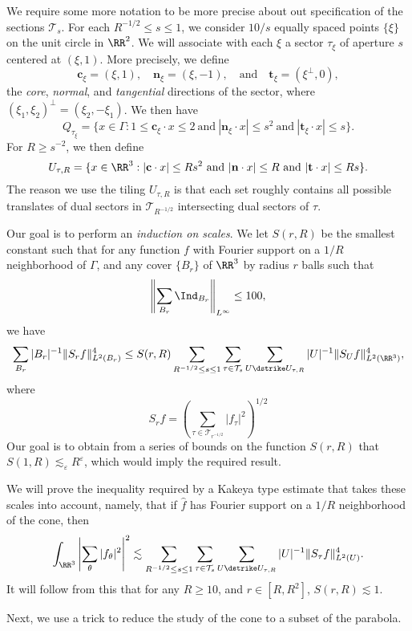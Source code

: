 We require some more notation to be more precise about out specification of the sections $\mathcal{T}_s$. For each $R^{-1/2} \leq s \leq 1$, we consider $10/s$ equally spaced points $\{ \xi \}$ on the unit circle in $\RR^2$. We will associate with each $\xi$ a sector $\tau_\xi$ of aperture $s$ centered at $(\xi,1)$. More precisely, we define
%
\[ \mathbf{c}_\xi = (\xi,1), \quad \mathbf{n}_\xi = (\xi,-1), \quad\text{and}\quad \mathbf{t}_\xi = (\xi^\perp, 0), \]
%
the \emph{core}, \emph{normal}, and \emph{tangential} directions of the sector, where $(\xi_1,\xi_2)^\perp = (\xi_2,- \xi_1)$. We then have
%
\[ Q_{\tau_\xi} = \{ x \in \Gamma: 1 \leq \mathbf{c}_\xi \cdot x \leq 2\ \text{and}\ |\mathbf{n}_\xi \cdot x| \leq s^2\ \text{and}\ |\mathbf{t}_\xi \cdot x| \leq s \}. \]
%
For $R \geq s^{-2}$, we then define
%
\[ U_{\tau,R} = \{ x \in \RR^3: |\mathbf{c} \cdot x| \leq R s^2\ \text{and}\ |\mathbf{n} \cdot x| \leq R\ \text{and}\ |\mathbf{t} \cdot x| \leq Rs \}. \]
%
The reason we use the tiling $U_{\tau,R}$ is that each set roughly contains all possible translates of dual sectors in $\mathcal{T}_{R^{-1/2}}$ intersecting dual sectors of $\tau$.

Our goal is to perform an \emph{induction on scales}. We let $S(r,R)$ be the smallest constant such that for any function $f$ with Fourier support on a $1/R$ neighborhood of $\Gamma$, and any cover $\{ B_r \}$ of $\RR^3$ by radius $r$ balls such that
%
\[ \left\| \sum_{B_r} \Ind_{B_r} \right\|_{L^\infty} \leq 100, \]
%
we have
%
\[ \sum_{B_r} |B_r|^{-1} \| S_r f \|_{L^2(B_r)}^4 \leq S(r,R) \sum_{R^{-1/2} \leq s \leq 1} \sum_{\tau \in \mathcal{T}_s} \sum_{U \dstrike U_{\tau,R}} |U|^{-1} \| S_U f \|_{L^2(\RR^3)}^4, \]
%
where
%
\[ S_r f = \left( \sum_{\tau \in \mathcal{T}_{r^{-1/2}}} |f_\tau|^2 \right)^{1/2} \]
%
Our goal is to obtain from a series of bounds on the function $S(r,R)$ that $S(1,R) \lesssim_\varepsilon R^\varepsilon$, which would imply the required result.

We will prove the inequality required by a Kakeya type estimate that takes these scales into account, namely, that if $\widehat{f}$ has Fourier support on a $1/R$ neighborhood of the cone, then
%
\[ \int_{\RR^3} \left| \sum_\theta |f_\theta|^2 \right|^2 \lesssim \sum_{R^{-1/2} \leq s \leq 1} \sum_{\tau \in \mathcal{T}_s} \sum_{U \dstrike U_{\tau,R}} |U|^{-1} \| S_\tau f \|_{L^2(U)}^4. \]
%
It will follow from this that for any $R \geq 10$, and $r \in [R,R^2]$, $S(r,R) \lesssim 1$.

Next, we use a trick to reduce the study of the cone to a subset of the parabola.


